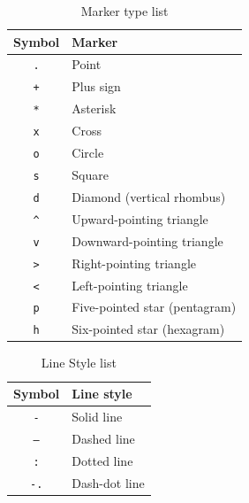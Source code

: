\begin{table}[htp]
\caption{Marker type list}
\label{markertype}
\begin{center}
\begin{tabular}{|c|l|}
\hline
\textbf{Symbol} & \textbf{Marker}\\
\hline
\texttt{.}  & Point\\
\texttt{+}  & Plus sign\\
\texttt{*}  & Asterisk\\
\texttt{x}  & Cross\\
\texttt{o}  & Circle\\
\texttt{s}  & Square\\
\texttt{d}  & Diamond (vertical rhombus)\\
\texttt{\textasciicircum} & Upward-pointing triangle\\
\texttt{v}  & Downward-pointing triangle\\
\texttt{\textgreater} & Right-pointing triangle\\
\texttt{\textless} & Left-pointing triangle\\
\texttt{p}  & Five-pointed star (pentagram)\\
\texttt{h}  & Six-pointed star (hexagram)\\
\hline
\end{tabular}
\end{center}
\end{table}


\begin{table}[htp]
\caption{Line Style list}
\label{linestyle}
\begin{center}
\begin{tabular}{|c|l|}
\hline
\textbf{Symbol} & \textbf{Line style}\\
\hline
\texttt{-}  & Solid line\\
\texttt{--}  & Dashed line\\
\texttt{:}  & Dotted line\\
\texttt{-.}  & Dash-dot line\\
\hline
\end{tabular}
\end{center}
\end{table}


